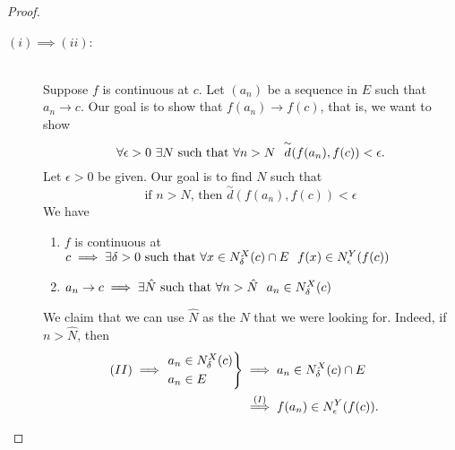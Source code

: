 \begin{proof}
    \begin{description}
        \item[$(i) \implies (ii)$:] \leavevmode \\
        Suppose $f$ is continuous at $c$. Let $(a_n)$ be a sequence in $E$ such that $a_n \to c.$ Our goal is to show that $f(a_n) \to f(c)$, that is, we want to show
        $$\forall \epsilon > 0 ~\exists N \text{ such that } \forall n > N ~~\overset{\sim}{d}(f(a_n), f(c)) < \epsilon.$$
        Let $\epsilon > 0$ be given. Our goal is to find $N$ such that
        \begin{equation*}
            \text{if $n > N$, then $\overset{\sim}{d}(f(a_n), f(c)) < \epsilon$} \tag{$*$}
        \end{equation*}
        We have
        \begin{enumerate}[$(I)$]
            \item $f$ is continuous at $c \implies \exists \delta > 0 \text{ such that } \forall x \in N_{\delta}^{X}(c)\cap E ~~f(x) \in N_{\epsilon}^{Y}(f(c))$
            \item $a_n \to c \implies \exists \hat{N} \text{ such that } \forall n > \hat{N} ~~a_n \in N_{\delta}^{X}(c)$
        \end{enumerate}
        We claim that we can use $\hat{N}$ as the $N$ that we were looking for. Indeed, if $n > \hat{N}$, then
        \begin{align*}
            (II) \implies
            \begin{rcases*}
                a_n \in \nbhds{\delta}{X}{c} \\
                a_n \in E
            \end{rcases*}
            &\implies a_n \in \nbhds{\delta}{X}{c}\cap E \\
            &\overset{(I)}{\implies} f(a_n) \in \nbhds{\epsilon}{Y}{f(c)}.
        \end{align*}


\end{description}
\end{proof}
